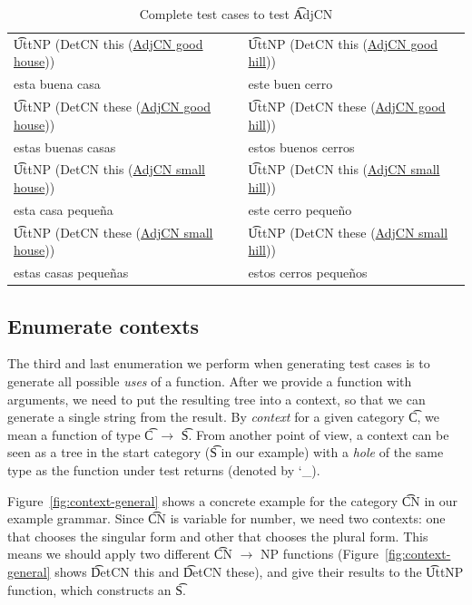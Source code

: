 \begin{table}[b]
\centering
\begin{tabular}{| l | l |}
\hline
\t{UttNP (DetCN this
    (\underline{AdjCN good house}))} & \t{UttNP (DetCN this
                                            (\underline{AdjCN good hill}))} \\
esta buena casa          & este buen cerro \\ \hline
\t{UttNP (DetCN these
    (\underline{AdjCN good house}))} & \t{UttNP (DetCN these
                                            (\underline{AdjCN good hill}))} \\
estas buenas casas       & estos buenos cerros \\ \hline
\t{UttNP (DetCN this
    (\underline{AdjCN small house}))} & \t{UttNP (DetCN this
                                            (\underline{AdjCN small hill}))} \\
esta casa peque\~{n}a          & este cerro peque\~{n}o \\ \hline
\t{UttNP (DetCN these
    (\underline{AdjCN small house}))} & \t{UttNP (DetCN these
                                            (\underline{AdjCN small hill}))} \\
estas casas peque\~{n}as      & estos cerros peque\~{n}os \\ \hline
\end{tabular}
\caption{Complete test cases to test \t{AdjCN}}
\label{tab:testCases}
\end{table}


\subsection{Enumerate contexts} 

The third and last enumeration we perform when generating test cases
is to generate all possible \emph{uses} of a function. After we
provide a function with arguments, we need to put the resulting tree
into a context, so that we can generate a single string from the
result. By \emph{context} for a given category \t{C}, we mean a
function of type \t{C} $\rightarrow$ \t{S}. From another point of view, a context
can be seen as a tree in the start category (\t{S}
in our example) with a \emph{hole} of the same type as the function
under test returns (denoted by \char`_).

Figure~\ref{fig:context-general} shows a concrete example for the
category \t{CN} in our example grammar.
Since \t{CN} is variable for number, we need two contexts:
one that chooses the singular form and other that chooses the plural
form.  This means we should apply two different \t{CN
  $\rightarrow$ NP} functions (Figure~\ref{fig:context-general} shows
\t{DetCN this} and \t{DetCN these}), and give their results to the
\t{UttNP} function, which constructs an \t{S}.

